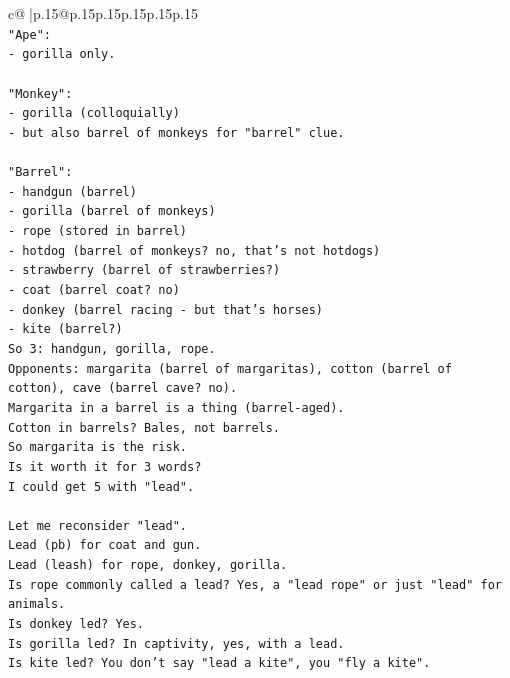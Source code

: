 \documentclass{article}
\begin{document}
{\begin{supertabular}{c@{$\;$}|p{.15\linewidth}@{}p{.15\linewidth}p{.15\linewidth}p{.15\linewidth}p{.15\linewidth}p{.15\linewidth}}
{{{\\ 
\texttt{"Ape":} \\
\texttt{{-} gorilla only.} \\
\\ 
\texttt{"Monkey":} \\
\texttt{{-} gorilla (colloquially)} \\
\texttt{{-} but also barrel of monkeys for "barrel" clue.} \\
\\ 
\texttt{"Barrel":} \\
\texttt{{-} handgun (barrel)} \\
\texttt{{-} gorilla (barrel of monkeys)} \\
\texttt{{-} rope (stored in barrel)} \\
\texttt{{-} hotdog (barrel of monkeys? no, that's not hotdogs)} \\
\texttt{{-} strawberry (barrel of strawberries?)} \\
\texttt{{-} coat (barrel coat? no)} \\
\texttt{{-} donkey (barrel racing {-} but that's horses)} \\
\texttt{{-} kite (barrel?)} \\
\texttt{So 3: handgun, gorilla, rope.} \\
\texttt{Opponents: margarita (barrel of margaritas), cotton (barrel of cotton), cave (barrel cave? no).} \\
\texttt{Margarita in a barrel is a thing (barrel{-}aged).} \\
\texttt{Cotton in barrels? Bales, not barrels.} \\
\texttt{So margarita is the risk.} \\
\texttt{Is it worth it for 3 words?} \\
\texttt{I could get 5 with "lead".} \\
\\ 
\texttt{Let me reconsider "lead".} \\
\texttt{Lead (pb) for coat and gun.} \\
\texttt{Lead (leash) for rope, donkey, gorilla.} \\
\texttt{Is rope commonly called a lead? Yes, a "lead rope" or just "lead" for animals.} \\
\texttt{Is donkey led? Yes.} \\
\texttt{Is gorilla led? In captivity, yes, with a lead.} \\
\texttt{Is kite led? You don't say "lead a kite", you "fly a kite".} \\
}}}
\end{supertabular}}
\end{document}
